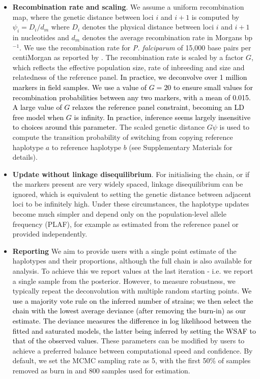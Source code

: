 \documentclass[9pt,lineno]{elife}
\begin{document}
\begin{itemize}
\begin{itemize}
\item {\bf Recombination rate and scaling}. We assume a uniform recombination map, where the genetic distance between loci $i$ and $i+1$ is computed by $\psi_i = D_i / d_m$ where $D_i$ denotes the physical distance between loci $i$ and $i+1$ in nucleotides and $d_m$ denotes the average recombination rate in Morgans bp$^{-1}$. We use the recombination rate for {\it P. falciparum} of 15,000 base pairs per centiMorgan as reported by \citet{Miles2016}. The recombination rate is scaled by a factor $G$, which reflects the effective population size, rate of inbreeding and size and relatedness of the reference panel. \textcolor{black}{In practice, we deconvolve over 1 million markers in field samples. We use a value of $G=20$ to ensure small values for recombination probabilities between any two markers, with a mean of 0.015. A large value of $G$ relaxes the reference panel constraint, becoming an LD free model when $G$ is infinity.  In practice, inference seems largely insensitive to choices around this parameter.}  The scaled genetic distance $G\psi$ is used to compute the transition probability of switching from copying reference haplotype $a$ to reference haplotype $b$ (see Supplementary Materials for details).

\item {\bf Update without linkage disequilibrium}. For initialising the chain, or if the markers present are very widely spaced, linkage disequilibrium can be ignored, which is equivalent to setting the genetic distance between adjacent loci to be infinitely high.  Under these circumstances, the haplotype updates become much simpler and depend only on the population-level allele frequency (PLAF), for example as estimated from the reference panel or provided independently.

\item {\bf Reporting} We aim to provide users with a single point estimate of the haplotypes and their proportions, although the full chain is also available for analysis.  To achieve this we report values at the last iteration - i.e. we report a single sample from the posterior.  However, to measure robustness, we typically repeat the deconvolution with multiple random starting points\textcolor{black}{. We use a majority vote rule on the inferred number of strains; we then select the chain with the lowest average deviance (after removing the burn-in) as our estimate. The deviance measures the difference in log likelihood between the fitted and saturated models, the latter being inferred by setting the WSAF to that of the observed values.} These parameters can be modified by users to achieve a preferred balance between computational speed and confidence.  By default, we set the MCMC sampling rate as 5, with the first 50\% of samples removed as burn in and 800 samples used for estimation.


\end{itemize}
\end{itemize}
\end{document}
